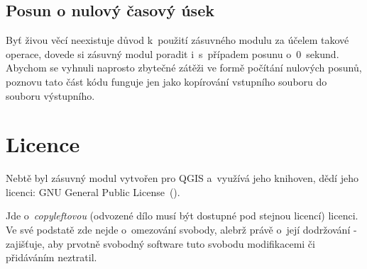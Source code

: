 \subsection{Posun o nulový časový úsek}
\label{nulovycas}

Byť živou věcí neexistuje důvod k~použití zásuvného modulu za účelem takové ope\-race,
dovede si zásuvný modul poradit i~s~případem posunu o~0~sekund. Abychom se vyhnuli
naprosto zbytečné zátěži ve formě počítání nulových posunů, poznovu tato část kódu
funguje jen jako kopírování vstupního souboru do souboru výstupního. 

\section{Licence}
\label{licence}

Nebtě byl zásuvný modul vytvořen pro QGIS a~využívá jeho knihoven, dědí jeho licenci: GNU General Public
License~(). 

Jde o~\textit{copyleftovou} (odvozené dílo musí být dostupné pod stejnou licencí)
licenci. Ve své podstatě zde nejde o~omezování svobody, alebrž právě o~její dodržování - zajišťuje,
aby prvotně svobodný software tuto svobodu modifikacemi či přidáváním neztratil. 



